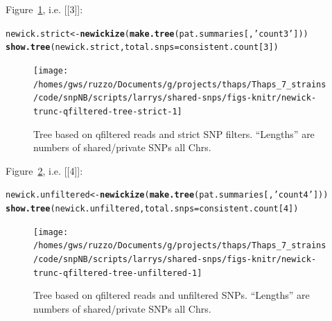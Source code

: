 \documentclass{article}\usepackage[]{graphicx}\usepackage[]{color}
\makeatletter
\newcommand{\hlnum}[1]{\textcolor[rgb]{0.686,0.059,0.569}{#1}}%
\newcommand{\hlstr}[1]{\textcolor[rgb]{0.192,0.494,0.8}{#1}}%
\newcommand{\hlstd}[1]{\textcolor[rgb]{0.345,0.345,0.345}{#1}}%
\newcommand{\hlkwb}[1]{\textcolor[rgb]{0.69,0.353,0.396}{#1}}%
\newcommand{\hlkwc}[1]{\textcolor[rgb]{0.333,0.667,0.333}{#1}}%
\newcommand{\hlkwd}[1]{\textcolor[rgb]{0.737,0.353,0.396}{\textbf{#1}}}%
\newenvironment{kframe}{%
 \def\at@end@of@kframe{}%
 \ifinner\ifhmode%
  \def\at@end@of@kframe{\end{minipage}}%
  \begin{minipage}{\columnwidth}%
 \fi\fi%
 \def\FrameCommand##1{\hskip\@totalleftmargin \hskip-\fboxsep
 \colorbox{shadecolor}{##1}\hskip-\fboxsep
     \hskip-\linewidth \hskip-\@totalleftmargin \hskip\columnwidth}%
 \MakeFramed {\advance\hsize-\width
   \@totalleftmargin\z@ \linewidth\hsize
   \@setminipage}}%
 {\par\unskip\endMakeFramed%
 \at@end@of@kframe}
\newenvironment{knitrout}{}{} %
\makeatother
\begin{document}
Figure~\ref{fig:tree-strict}, i.e. [[3]]:

\begin{knitrout}\scriptsize
{}\color{fgcolor}\begin{kframe}
\begin{alltt}
\hlstd{newick.strict} \hlkwb{<-} \hlkwd{newickize}\hlstd{(}\hlkwd{make.tree}\hlstd{(pat.summaries[,}\hlstr{'count3'}\hlstd{]))}
\hlkwd{show.tree}\hlstd{(newick.strict,} \hlkwc{total.snps}\hlstd{=consistent.count[}\hlnum{3}\hlstd{])}
\end{alltt}
\end{kframe}\begin{figure}

{\centering \texttt{[image: /homes/gws/ruzzo/Documents/g/projects/thaps/Thaps\_7\_strains/code/snpNB/scripts/larrys/shared-snps/figs-knitr/newick-trunc-qfiltered-tree-strict-1]} 

}

\caption[Tree based on qfiltered reads and strict SNP filters]{Tree based on qfiltered reads and strict SNP filters.  ``Lengths'' are numbers of shared/private SNPs all Chrs.}\label{fig:tree-strict}
\end{figure}


\end{knitrout}

Figure~\ref{fig:tree-unfiltered}, i.e. [[4]]:

\begin{knitrout}\scriptsize
{}\color{fgcolor}\begin{kframe}
\begin{alltt}
\hlstd{newick.unfiltered} \hlkwb{<-} \hlkwd{newickize}\hlstd{(}\hlkwd{make.tree}\hlstd{(pat.summaries[,}\hlstr{'count4'}\hlstd{]))}
\hlkwd{show.tree}\hlstd{(newick.unfiltered,} \hlkwc{total.snps}\hlstd{=consistent.count[}\hlnum{4}\hlstd{])}
\end{alltt}
\end{kframe}\begin{figure}

{\centering \texttt{[image: /homes/gws/ruzzo/Documents/g/projects/thaps/Thaps\_7\_strains/code/snpNB/scripts/larrys/shared-snps/figs-knitr/newick-trunc-qfiltered-tree-unfiltered-1]} 

}

\caption[Tree based on qfiltered reads and unfiltered SNPs]{Tree based on qfiltered reads and unfiltered SNPs.  ``Lengths'' are numbers of shared/private SNPs all Chrs.}\label{fig:tree-unfiltered}
\end{figure}


\end{knitrout}
\end{document}
